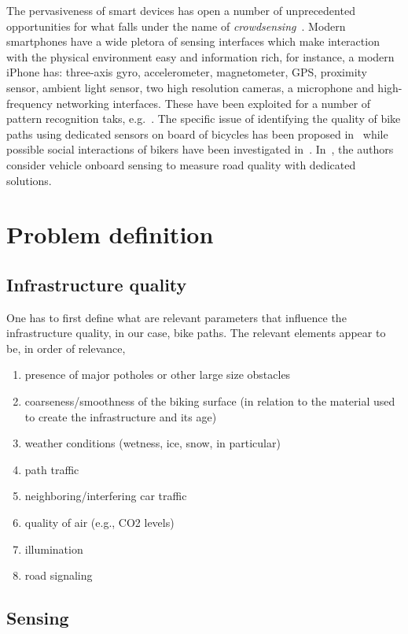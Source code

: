 \documentclass[preprint,12pt]{elsarticle}
\theoremstyle{definition}
\begin{document}
The pervasiveness of smart devices has open a number of unprecedented
opportunities for what falls under the name of {\em
  crowdsensing}~\cite{gan:mob11}. Modern smartphones have a wide
pletora of sensing interfaces which make interaction with the physical
environment easy and information rich, for instance, a modern iPhone
has: three-axis gyro, accelerometer, magnetometer, GPS, proximity
sensor, ambient light sensor, two high resolution cameras, a
microphone and high-frequency networking interfaces. These have been
exploited for a number of pattern recognition taks,
e.g.~\cite{fuj:iph10}. The specific issue of identifying the quality
of bike paths using dedicated sensors on board of bicycles has been
proposed in~\cite{eis:bik07} while possible social interactions of
bikers have been investigated
in~\cite{red:bik10}. In~\cite{eri:pot08}, the authors consider vehicle
onboard sensing to measure road quality with dedicated solutions.



\section{Problem definition}

\subsection{Infrastructure quality}

One has to first define what are relevant parameters that influence
the infrastructure quality, in our case, bike paths. The relevant
elements appear to be, in order of relevance,
\begin{enumerate}
\item presence of major potholes or other large size obstacles
\item coarseness/smoothness of the biking surface (in relation to the
  material used to create the infrastructure and its age)
\item weather conditions (wetness, ice, snow, in particular)
\item path traffic 
\item neighboring/interfering car traffic
\item quality of air (e.g., CO2 levels)
\item illumination
\item road signaling 
\end{enumerate}


\subsection{Sensing}
\end{document}
